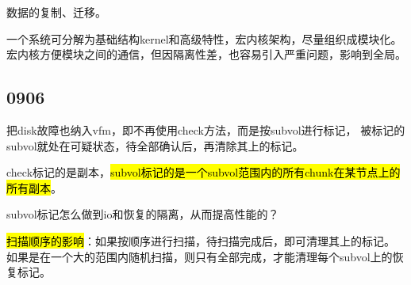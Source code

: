 数据的复制、迁移。

一个系统可分解为基础结构kernel和高级特性，宏内核架构，尽量组织成模块化。
宏内核方便模块之间的通信，但因隔离性差，也容易引入严重问题，影响到全局。

\subsection{0906}

把disk故障也纳入vfm，即不再使用check方法，而是按subvol进行标记，
被标记的subvol就处在可疑状态，待全部确认后，再清除其上的标记。

check标记的是副本，\hl{subvol标记的是一个subvol范围内的所有chunk在某节点上的所有副本}。

subvol标记怎么做到io和恢复的隔离，从而提高性能的？

\hl{扫描顺序的影响}：如果按顺序进行扫描，待扫描完成后，即可清理其上的标记。
如果是在一个大的范围内随机扫描，则只有全部完成，才能清理每个subvol上的恢复标记。
